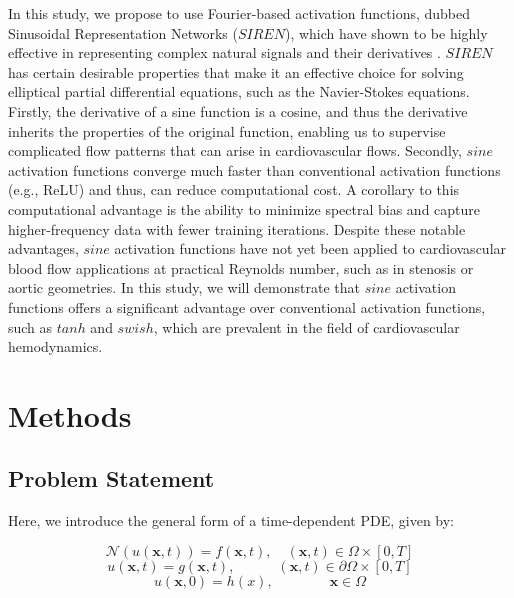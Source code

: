 \documentclass[times,twocolumn,final]{elsarticle}
\begin{document}
{In this study, we propose to use Fourier-based activation functions, dubbed Sinusoidal Representation Networks ($SIREN$), which have shown to be highly effective in representing complex natural signals and their derivatives \citep{Sitzmann2020_PINNs, Pan2022_PINNs}. $SIREN$ has certain desirable properties that make it an effective choice for solving elliptical partial differential equations, such as the Navier-Stokes equations. Firstly, the derivative of a sine function is a cosine, and thus the derivative inherits the properties of the original function, enabling us to supervise complicated flow patterns that can arise in cardiovascular flows. Secondly, $sine$ activation functions converge much faster than conventional activation functions (e.g., ReLU) and thus, can reduce computational cost. A corollary to this computational advantage is the ability to minimize spectral bias and capture higher-frequency data with fewer training iterations. Despite these notable advantages, $sine$ activation functions have not yet been applied to cardiovascular blood flow applications at practical Reynolds number, such as in stenosis or aortic geometries. In this study, we will demonstrate that $sine$ activation functions offers a significant advantage over conventional activation functions, such as $tanh$ and $swish$, which are prevalent in the field of cardiovascular hemodynamics. 

\section{Methods}

\subsection{Problem Statement}
Here, we introduce the general form of a time-dependent PDE, given by:

\begin{equation}
\mathcal{N}(u(\textbf{x},t)) =  f(\textbf{x},t), \quad  (\textbf{x},t) \in \Omega \times [0,T]
\end{equation}
\begin{equation}
u(\textbf{x},t) =  g(\textbf{x},t), \quad \quad \quad  (\textbf{x},t) \in \partial \Omega \times [0,T]
\end{equation}
\begin{equation}
u(\textbf{x},0) =  h(x), \quad \quad \quad \quad \textbf{x} \in \Omega 
\end{equation}

}
\end{document}

